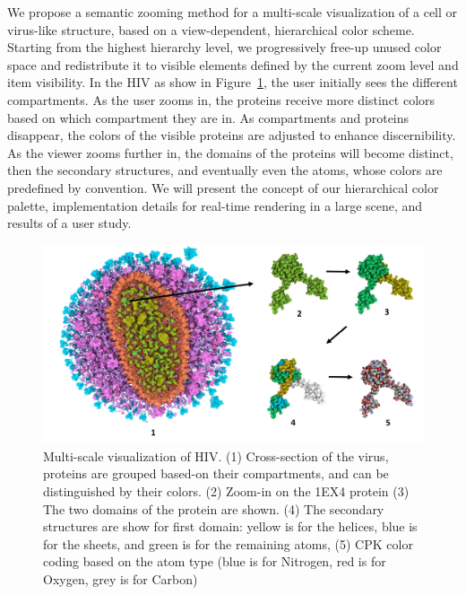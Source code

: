 \documentclass[review,journal]{vgtc}         %
\begin{document}
	We propose a semantic zooming method for a multi-scale visualization of a cell or virus-like structure, based on a view-dependent, hierarchical color scheme.
	Starting from the highest hierarchy level, we progressively free-up unused color space and redistribute it to visible elements defined by the current zoom level and item visibility.
	In the HIV as show in Figure~\ref{fig:Picture2}, the user initially sees the different compartments. 
	As the user zooms in, the proteins receive more distinct colors based on which compartment they are in. 
	As compartments and proteins disappear, the colors of the visible proteins are adjusted to enhance discernibility.  
	As the viewer zooms further in, the domains of the proteins will become distinct, then the secondary structures, and eventually even the atoms, whose colors are predefined by convention. 
	We will present the concept of our hierarchical color palette, implementation details for real-time rendering in a large scene, and results of a user study.
	
	\begin{figure}
		\centering
		\includegraphics[width=1\linewidth]{Figures/Picture2_}
		\caption{Multi-scale visualization of HIV. (1) Cross-section of the virus, proteins are grouped based-on their compartments, and can be distinguished by their colors. (2) Zoom-in on the 1EX4 protein (3) The two domains of the protein are shown. (4) The secondary structures are show for first domain: yellow is for the helices, blue is for the sheets, and green is for the remaining atoms, (5) CPK color coding based on the atom type (blue is for Nitrogen, red is for Oxygen, grey is for Carbon)}
		\label{fig:Picture2}
	\end{figure}
	
\end{document}
